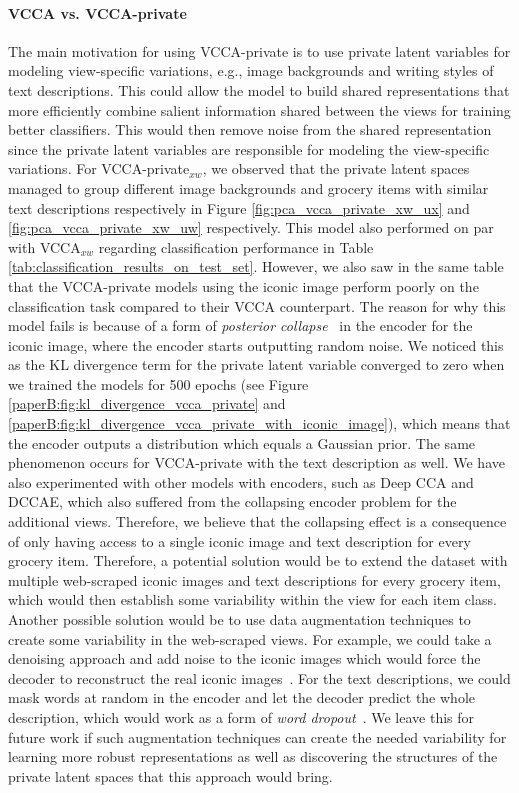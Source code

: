 \vspace{-3mm}
\paragraph{VCCA vs. VCCA-private} The main motivation for using VCCA-private is to use private latent variables for modeling view-specific variations, e.g., image backgrounds and writing styles of text descriptions. This could allow the model to build shared representations that more efficiently combine salient information shared between the views for training better classifiers. This would then remove noise from the shared representation since the private latent variables are responsible for modeling the view-specific variations. For VCCA-private$_{x w}$, we observed that the private latent spaces managed to group different image backgrounds and grocery items with similar text descriptions respectively in Figure \ref{fig:pca_vcca_private_xw_ux} and \ref{fig:pca_vcca_private_xw_uw} respectively. This model also performed on par with VCCA$_{x w}$ regarding classification performance in Table \ref{tab:classification_results_on_test_set}. However, we also saw in the same table that the VCCA-private models using the iconic image perform poorly on the classification task compared to their VCCA counterpart. The reason for why this model fails is because of a form of \textit{posterior collapse}~ in the encoder for the iconic image, where the encoder starts outputting random noise. We noticed this as the KL divergence term for the private latent variable converged to zero when we trained the models for 500 epochs (see Figure \ref{paperB:fig:kl_divergence_vcca_private} and \ref{paperB:fig:kl_divergence_vcca_private_with_iconic_image}), %
which means that the encoder outputs a distribution which equals a Gaussian prior. The same phenomenon occurs for VCCA-private with the text description as well. We have also experimented with other models with encoders, such as Deep CCA and DCCAE, which also suffered from the collapsing encoder problem for the additional views. Therefore, we believe that the collapsing effect is a consequence of only having access to a single iconic image and text description for every grocery item. Therefore, a potential solution would be to extend the dataset with multiple web-scraped iconic images and text descriptions for every grocery item, which would then establish some variability within the view for each item class. Another possible solution would be to use data augmentation techniques to create some variability in the web-scraped views. For example, we could take a denoising approach and add noise to the iconic images which would force the decoder to reconstruct the real iconic images~. For the text descriptions, we could mask words at random in the encoder and let the decoder predict the whole description, which would work as a form of \textit{word dropout}~. We leave this for future work if such augmentation techniques can create the needed variability for learning more robust representations as well as discovering the structures of the private latent spaces that this approach would bring. 

